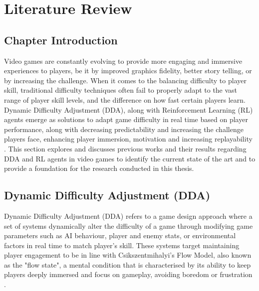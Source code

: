 

\chapter{Literature Review}
\begin{spacing}{2.0}

	\section{Chapter Introduction}

	Video games are constantly evolving to provide more engaging and immersive experiences to players, be it by improved graphics fidelity, better story telling, or by increasing the challenge.
	When it comes to the balancing difficulty to player skill, traditional difficulty techniques often fail to properly adapt to the vast range of player skill levels, and the difference on how fast certain players learn.
	Dynamic Difficulty Adjustment (DDA), along with Reinforcement Learning (RL) agents emerge as solutions to adapt game difficulty in real time based on player performance, along with decreasing predictability and
	increasing the challenge players face, enhancing player immersion, motivation and increasing replayability \cite{grech_creating_2023} \cite{mercieca_evaluating_2023} \cite{attard_analysing_2021}. This section explores and discusses previous works and their results regarding DDA and RL agents in video games
	to identify the current state of the art and to provide a foundation for the research conducted in this thesis.

	\section{Dynamic Difficulty Adjustment (DDA)}

	Dynamic Difficulty Adjustment (DDA) refers to a game design approach where a set of systems dynamically alter the difficulty of a game through modifying game parameters such as AI behaviour,
	player and enemy stats, or environmental factors in real time to match player's skill. These systems target maintaining player engagement to be in line with Csikszentmihalyi's Flow Model, also known as the
	"flow state", a mental condition that is characterised by its ability to keep players deeply immersed and focus on gameplay, avoiding boredom or frustration \cite{grech_creating_2023} \cite{mifsud_utilizing_2021} \cite{laus_dynamic_2022} \cite{vang_impact_2022}.


\end{spacing}
